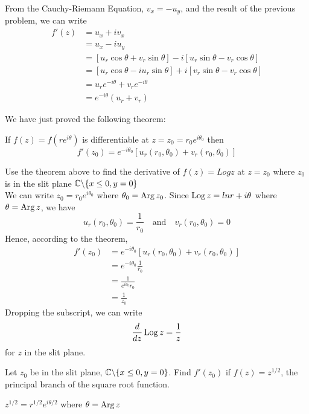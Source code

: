 \documentclass[handout]{ximera}
\begin{document}
From the Cauchy-Riemann Equation, $v_x = -u_y$, and the result of the previous problem, we can write
\begin{align*}
f'(z) &= u_x + iv_x\\
      & = u_x - iu_y\\
      &= \left[u_r \cos \theta + v_r \sin \theta\right] - i\left[ u_r \sin \theta - v_r \cos \theta \right]\\
      &= \left[u_r \cos \theta -i u_r \sin \theta\right] + i\left[v_r \sin \theta  - v_r \cos \theta \right]\\
      &= u_r e^{-i\theta} + v_r e^{-i\theta}\\
      &=  e^{-i\theta}(u_r +v_r)
\end{align*}

We have just proved the following theorem:

\begin{theorem}
If $f(z) = f\left(re^{i\theta}\right)$ is differentiable at $z = z_0 = r_0 e^{i\theta_0}$ then
\[
f'(z_0) = e^{-i\theta_0} \left[u_r(r_0, \theta_0) + v_r(r_0, \theta_0)\right]
\]
\end{theorem}

\begin{example}
Use the theorem above to find the derivative of $f(z) = Log z$ at $z = z_0$ where $z_0$ is in the 
slit plane $\mathbb C \backslash \{x\leq 0, y=0\}$ \\
We can write $z_0 = r_0 e^{i\theta_0}$ where $\theta_0 = \operatorname{Arg} z_0$. Since $\operatorname{Log} z = ln r + i\theta$
where $\theta = \operatorname{Arg} z$, we have 
\[
u_r(r_0,\theta_0) = \frac{1}{r_0} \quad \mbox{and} \quad v_r(r_0,\theta_0) = 0
\]
Hence, according to the theorem,
\begin{align*}
f'(z_0) &= e^{-i\theta_0}[u_r(r_0,\theta_0)+v_r(r_0,\theta_0)] \\
        &= e^{-i\theta_0}\frac{1}{r_0}\\
        &= \frac{1}{e^{i\theta_0}r_0}\\
        &= \frac{1}{z_0}
\end{align*}
Dropping the subscript, we can write
\[
\frac{d}{dz} \operatorname{Log} z = \frac{1}{z}
\]
for $z$ in the slit plane.
\end{example}

\begin{problem} Let $z_0$ be in the slit plane, $\mathbb C \backslash \{x\leq 0, y=0\}$. 
Find $f'(z_0)$ if $f(z) = z^{1/2}$, the principal branch of the square root function.
\begin{hint}
$z^{1/2} = r^{1/2}e^{i\theta/2}$ where $\theta = \operatorname{Arg} z$
\end{hint}
\end{problem}
\end{document}
